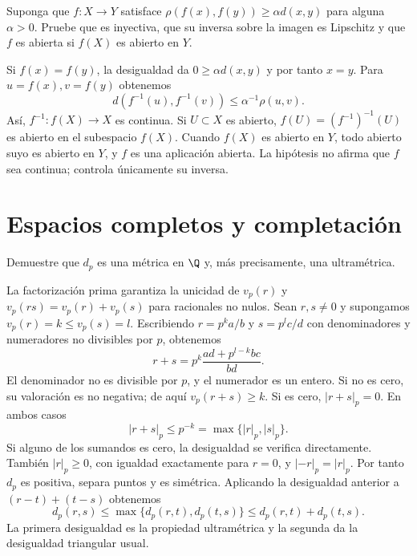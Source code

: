 \begin{ejercicio}\label{ej:lectura-7-7}
Suponga que $f:X\to Y$ satisface $\rho(f(x),f(y))\geq\alpha d(x,y)$ para alguna $\alpha>0$. Pruebe que es inyectiva, que su inversa sobre la imagen es Lipschitz y que $f$ es abierta si $f(X)$ es abierto en $Y$.
\end{ejercicio}
\begin{solucion}
Si $f(x)=f(y)$, la desigualdad da $0\geq\alpha d(x,y)$ y por tanto $x=y$. Para $u=f(x),v=f(y)$ obtenemos
\[
 d(f^{-1}(u),f^{-1}(v))\leq\alpha^{-1}\rho(u,v).
\]
Así, $f^{-1}:f(X)\to X$ es continua. Si $U\subset X$ es abierto, $f(U)=(f^{-1})^{-1}(U)$ es abierto en el subespacio $f(X)$. Cuando $f(X)$ es abierto en $Y$, todo abierto suyo es abierto en $Y$, y $f$ es una aplicación abierta. La hipótesis no afirma que $f$ sea continua; controla únicamente su inversa.
\end{solucion}

\chapter{Espacios completos y completación}

\begin{ejercicio}\label{ej:lectura-8-1}
Demuestre que $d_p$ es una métrica en $\Q$ y, más precisamente, una ultramétrica.
\end{ejercicio}
\begin{solucion}
La factorización prima garantiza la unicidad de $v_p(r)$ y $v_p(rs)=v_p(r)+v_p(s)$ para racionales no nulos. Sean $r,s\ne0$ y supongamos $v_p(r)=k\leq v_p(s)=l$. Escribiendo $r=p^ka/b$ y $s=p^lc/d$ con denominadores y numeradores no divisibles por $p$, obtenemos
\[
 r+s=p^k\frac{ad+p^{l-k}bc}{bd}.
\]
El denominador no es divisible por $p$, y el numerador es un entero. Si no es cero, su valoración es no negativa; de aquí $v_p(r+s)\geq k$. Si es cero, $|r+s|_p=0$. En ambos casos
\[
 |r+s|_p\leq p^{-k}=\max\{|r|_p,|s|_p\}.
\]
Si alguno de los sumandos es cero, la desigualdad se verifica directamente. También $|r|_p\geq0$, con igualdad exactamente para $r=0$, y $|-r|_p=|r|_p$. Por tanto $d_p$ es positiva, separa puntos y es simétrica. Aplicando la desigualdad anterior a $(r-t)+(t-s)$ obtenemos
\[
 d_p(r,s)\leq\max\{d_p(r,t),d_p(t,s)\}\leq d_p(r,t)+d_p(t,s).
\]
La primera desigualdad es la propiedad ultramétrica y la segunda da la desigualdad triangular usual.
\end{solucion}

